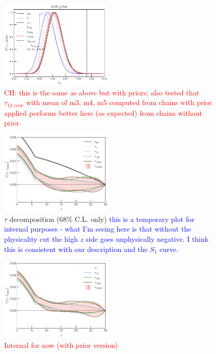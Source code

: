 \documentclass[prd,twocolumn,amsmath,amssymb,floatfix,superscriptaddress,nofootinbib]{revtex4-1}
\newcommand{\wh}[1]{\textcolor{blue}{#1}}
\newcommand{\ch}[1]{\textcolor{red}{#1}}
\begin{document}
{\begin{figure}[ht]
\includegraphics[width=0.48\textwidth]{results/tau_pc_decomposition/plot_taumj_decomposition_apply_cut_True_pl18_pc_zmax30_pliklite_srollv2_1015.pdf}
\caption{ \ch{CH: this is the same as above but with priors; also tested that $\tau_{12, new}$ with mean of m3, m4, m5 computed from chains with prior applied performs better here (as expected) from chains without prior.}}
\end{figure}



\begin{figure}[ht]
\includegraphics[width=0.48\textwidth]{results/tau_pc_decomposition/pl18_taugtz_pc_decomposition_68_only.pdf}
\caption{$\tau$ decomposition (68\% C.L. only) \wh{this is a temporary plot for internal purposes - what I'm seeing here is that without the physicality cut the high $z$ side goes unphysically negative.  I think this is consistent with our description and the $S_1$ curve.}}
\end{figure}

\begin{figure}[ht]
\includegraphics[width=0.48\textwidth]{results/tau_pc_decomposition/pl18_taugtz_pc_decomposition_68_only_apply_cut_True.pdf}
\caption{\ch{Internal for now (with prior version)}}
\end{figure}


}
\end{document}
